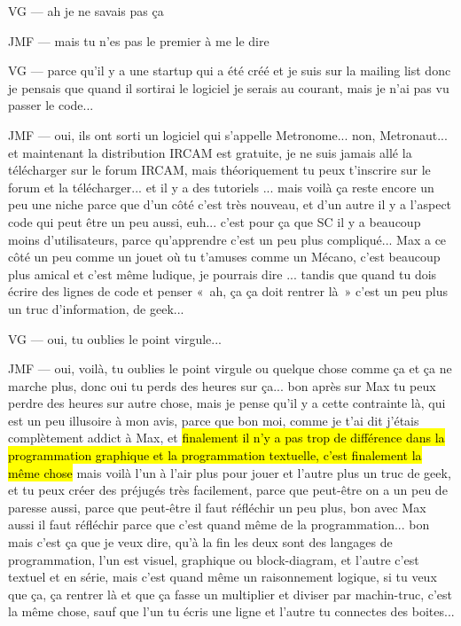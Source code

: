 VG — ah je ne savais pas ça 

JMF — mais tu n'es pas le premier à me le dire  

VG — parce qu'il y a une startup qui a été créé et je suis sur la mailing list donc je pensais que quand il sortirai le logiciel je serais au courant, mais je n'ai pas vu passer le code... 

JMF — oui, ils ont sorti un logiciel qui s'appelle Metronome... non, Metronaut... et maintenant la distribution IRCAM est gratuite, je ne suis jamais allé la télécharger sur le forum IRCAM, mais théoriquement tu peux t'inscrire sur le forum et la télécharger... et il y a des tutoriels ... mais voilà ça reste encore un peu une niche parce que d'un côté c'est très nouveau, et d'un autre il y a l'aspect code qui peut être un peu aussi, euh... c'est pour ça que SC il y a beaucoup moins d'utilisateurs, parce qu'apprendre c'est un peu plus compliqué... Max a ce côté un peu comme un jouet où tu t'amuses comme un Mécano, c'est beaucoup plus amical et c'est même ludique, je pourrais dire ... tandis que quand tu dois écrire des lignes de code et penser « ah, ça ça doit rentrer là » c'est un peu plus un truc d'information, de geek... 

VG — oui, tu oublies le point virgule... 

JMF — oui, voilà, tu oublies le point virgule ou quelque chose comme ça et ça ne marche plus, donc oui tu perds des heures sur ça... bon après sur Max tu peux perdre des heures sur autre chose, mais je pense qu'il y a cette contrainte là, qui est un peu illusoire à mon avis, parce que bon moi, comme je t'ai dit j'étais complètement addict à Max, et \hl{finalement il n'y a pas trop de différence dans la programmation graphique et la programmation textuelle, c'est finalement la même chose} mais voilà l'un à l'air plus pour jouer et l'autre plus un truc de geek, et tu peux créer des préjugés très facilement, parce que peut-être on a un peu de paresse aussi, parce que peut-être il faut réfléchir un peu plus, bon avec Max aussi il faut réfléchir parce que c'est quand même de la programmation... bon mais c'est ça que je veux dire, qu'à la fin les deux sont des langages de programmation, l'un est visuel, graphique ou block-diagram, et l'autre c'est textuel et en série, mais c'est quand même un raisonnement logique, si tu veux que ça, ça rentrer là et que ça fasse un multiplier et diviser par machin-truc, c'est la même chose, sauf que l'un tu écris une ligne et l'autre tu connectes des boites...  

